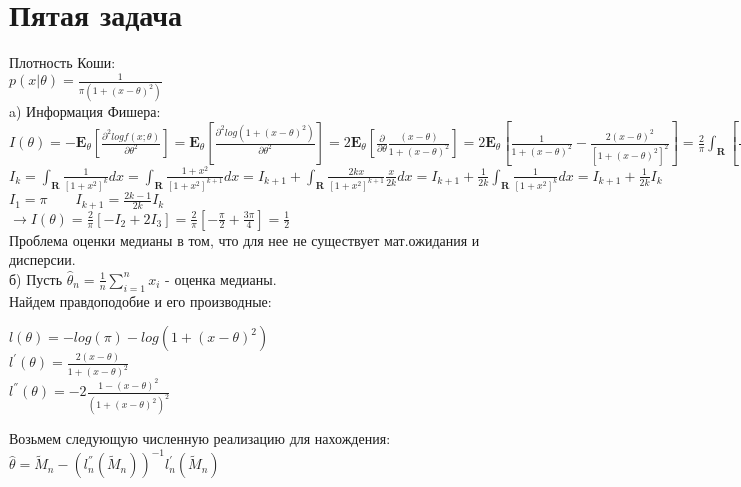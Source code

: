 \documentclass{article}
\begin{document}
\section{Пятая задача}
Плотность Коши:\\
$p(x|\theta) = \frac{1}{\pi(1 + (x-\theta)^2)}$\\
a) Информация Фишера:\\
$I(\theta) = -\mathbf{E}_{\theta}[\frac{\partial^2 logf(x;\theta)}{\partial \theta^2}] = \mathbf{E}_{\theta}[\frac{\partial^2 log(1+(x-\theta)^2)}{\partial \theta^2}] = 2\mathbf{E}_{\theta}[\frac{\partial}{\partial \theta} \frac{(x-\theta)}{1 + (x - \theta)^2}] = 2\mathbf{E}_{\theta}[\frac{1}{1 + (x-\theta)^2} - \frac{2(x-\theta)^2}{[1 + (x-\theta)^2]^2}] = \frac{2}{\pi} \int_{\mathbf{R}} [\frac{1}{[1 + (x - \theta)^2]^2} - \frac{2(x-\theta)^2}{[1 + (x - \theta)^2]^3}]dx = \frac{2}{\pi} \int_{\mathbf{R}} [\frac{1}{[1 + x^2]^2} - \frac{2x^2}{[1 + x^2]^3}]dx = \frac{2}{\pi} \int_{\mathbf{R}} [\frac{1}{[1 + x^2]^2} - \frac{2}{[1 + x^2]^2} + \frac{2}{[1 + x^2]^3}]dx = \frac{2}{\pi} \int_{\mathbf{R}} [-\frac{1}{[1 + x^2]^2} + \frac{2}{[1 + x^2]^3}]dx$\\
$I_k = \int_{\mathbf{R}} \frac{1}{[1 + x^2]^k}dx = \int_{\mathbf{R}} \frac{1 + x^2}{[1 + x^2]^{k+1}}dx = I_{k+1} + \int_{\mathbf{R}} \frac{2kx}{[1 + x^2]^{k+1}}\frac{x}{2k}dx = I_{k+1} + \frac{1}{2k}\int_{\mathbf{R}}\frac{1}{[1 + x^2]^k}dx = I_{k+1} + \frac{1}{2k}I_k$\\
$I_1 = \pi \qquad I_{k+1} = \frac{2k-1}{2k}I_{k}$\\
$\to I(\theta) = \frac{2}{\pi}[-I_2 + 2I_3] = \frac{2}{\pi}[-\frac{\pi}{2} + \frac{3\pi}{4}] = \frac{1}{2}$\\
Проблема оценки медианы в том, что для нее не существует мат.ожидания и дисперсии.\\
б) Пусть $\hat{\theta}_n = \frac{1}{n}\sum\limits_{i=1}^n x_i$ - оценка медианы.\\
Найдем правдоподобие и его производные:
\begin{center}
$l(\theta) = -log(\pi) - log(1 + (x - \theta)^2)$\\
$l^{'}(\theta) = \frac{2(x - \theta)}{1 + (x - \theta)^2}$\\
$l^{''}(\theta) = -2\frac{1 - (x-\theta)^2}{(1 + (x - \theta)^2)^2}$
\end{center} 
Возьмем следующую численную реализацию для нахождения:\\
$\hat{\theta} = \tilde{M}_n - (l_n^{''}(\tilde{M}_n))^{-1} l_n^{'}(\tilde{M}_n)$\\
\end{document}

